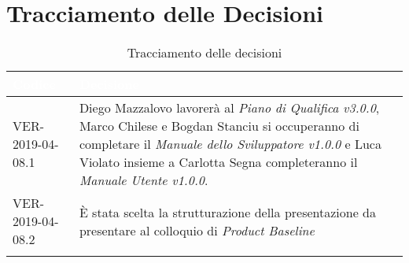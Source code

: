 \newpage
\section{Tracciamento delle Decisioni}

\begin{longtable}{|C{.40\textwidth}|C{.60\textwidth}|}
\hline
{}\textbf{\textcolor{white}{Codice}} & \textbf{\textcolor{white}{Decisione}}\\
\hline
VER-2019-04-08.1 & Diego Mazzalovo lavorerà al \textit{Piano di Qualifica v3.0.0}, Marco Chilese e Bogdan Stanciu si occuperanno di completare il \textit{Manuale dello Sviluppatore v1.0.0} e Luca Violato insieme a Carlotta Segna completeranno il \textit{Manuale Utente v1.0.0}. \\
\hline
{}VER-2019-04-08.2 & È stata scelta la strutturazione della presentazione da presentare al colloquio di \textit{Product Baseline} \\
\hline

\caption{Tracciamento delle decisioni}
\end{longtable}
